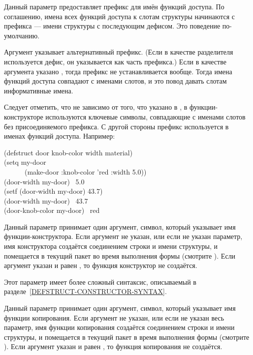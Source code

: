 \begin{flushdesc}
\item[\cd{:conc-name}] Данный параметр предоставляет префикс для имён функций
  доступа.  По соглашению, имена всех функций доступа к слотам структуры
  начинаются с префикса --- имени структуры с последующим дефисом. Это поведение
  по-умолчанию.

  Аргумент  указывает альтернативный префикс. (Если в качестве
  разделителя используется дефис, он указывается как часть префикса.) Если в
  качестве аргумента указано {\false}, тогда префикс не устанавливается вообще.
  Тогда имена функций доступа совпадают с именами слотов, и это повод давать
  слотам информативные имена.

  Следует отметить, что не зависимо от того, что указано в , в
  функции-конструкторе используются ключевые символы, совпадающие с именами
  слотов без присоединяемого префикса. С другой стороны префикс используется в
  именах функций доступа. Например:
  \begin{lisp}
    (defstruct door knob-color width material) \\
    (setq my-door \\
    ~~~~~~(make-door :knob-color 'red :width 5.0)) \\
    (door-width my-door) \EV\ 5.0 \\
    (setf (door-width my-door) 43.7) \\
    (door-width my-door) \EV\ 43.7 \\
    (door-knob-color my-door) \EV\ red
  \end{lisp}

\item[\cd{:constructor}] Данный параметр принимает один аргумент,
  символ, который указывает имя функции-конструктора. Если аргумент не
  указан, или если не указан параметр, имя конструктора создаётся
  соединением строки  и имени структуры, и помещается в
  текущий пакет во время выполнения формы  (смотрите
  ).  Если аргумент указан и равен {\false}, то функция
  конструктор не создаётся.

  Этот параметр имеет более сложный синтаксис, описываемый в
  разделе~\ref{DEFSTRUCT-CONSTRUCTOR-SYNTAX}.

\item[\cd{:copier}] Данный параметр принимает один аргумент, символ, который
  указывает имя функции копирования. Если аргумент не указан, или если не указан
  весь параметр, имя функции копирования создаётся соединением строки
   и имени структуры, и помещается в текущий пакет в время
  выполнения формы  (смотрите ).  Если аргумент
  указан и равен {\false}, то функция копирования не создаётся.


\end{flushdesc}
